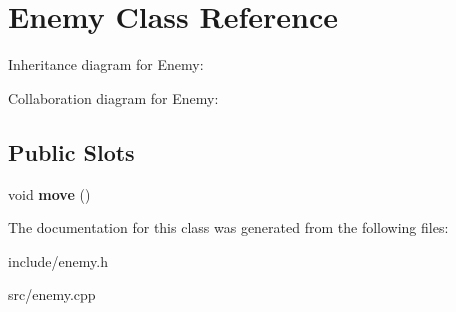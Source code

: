 \hypertarget{classEnemy}{}\section{Enemy Class Reference}
\label{classEnemy}


Inheritance diagram for Enemy\+:


Collaboration diagram for Enemy\+:
\subsection*{Public Slots}
\begin{DoxyCompactItemize}
\item 
\mbox{\label{classEnemy_a9a398f8d12234f02563b27440aff7891}} 
void {\bfseries move} ()
\end{DoxyCompactItemize}


The documentation for this class was generated from the following files\+:\begin{DoxyCompactItemize}
\item 
include/enemy.\+h\item 
src/enemy.\+cpp\end{DoxyCompactItemize}

